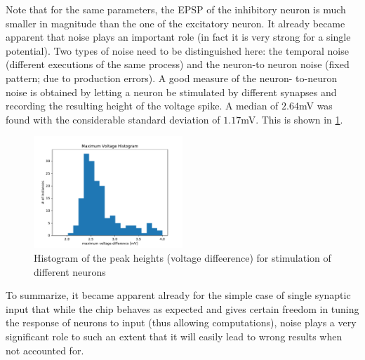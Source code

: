 \documentclass[a4paper,twocolumn]{article}
\begin{document}
Note that for the same parameters,  the EPSP of the inhibitory neuron is much
smaller in magnitude than the one of the excitatory neuron.
It already became apparent that noise plays an important role (in fact it is very
strong for a single potential).  Two types of noise need to be distinguished here:
the temporal noise (different executions of the same process) and the neuron-to
neuron noise (fixed pattern; due to production errors).  A good measure of the neuron-
to-neuron noise is obtained by letting a neuron be stimulated by different synapses
and recording the resulting height of the voltage spike.  A median of $2.64$mV was
found with the considerable standard deviation of $1.17$mV.  This is shown in
\ref{MaxVoltHisto}.
\begin{figure}
		\includegraphics[width=0.5\textwidth]{figures/histo_maxVolt.pdf}
		\caption{Histogram of the peak heights (voltage diffeerence) for stimulation 
		of different neurons}
		\label{MaxVoltHisto}
\end{figure}
To summarize,  it became apparent already for the simple case of single synaptic
input that while the chip behaves as expected and gives certain freedom in tuning
the response of neurons to input (thus allowing computations),  noise plays a very
significant role to such an extent that it will easily lead to wrong results when not
accounted for.
\end{document}
